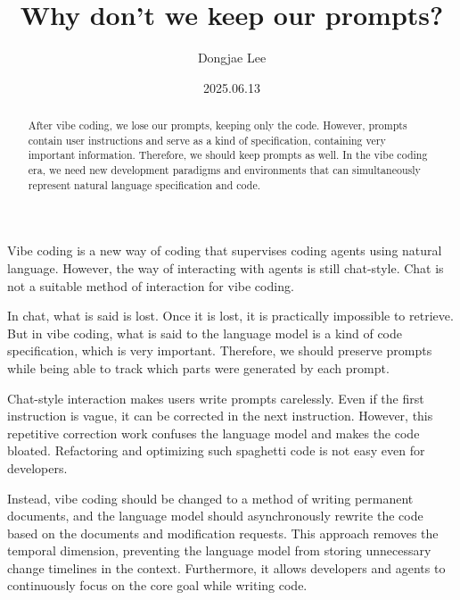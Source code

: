 \documentclass[11pt, oneside]{article}
\title{Why don't we keep our prompts?}
\author{Dongjae Lee}
\date{2025.06.13}
\begin{document}
\maketitle

\begin{abstract}
	After vibe coding, we lose our prompts, keeping only the code.
	However, prompts contain user instructions and serve as a kind of specification, containing very important information.
	Therefore, we should keep prompts as well.
	In the vibe coding era, we need new development paradigms and environments that can simultaneously represent natural language specification and code.
\end{abstract}

Vibe coding is a new way of coding that supervises coding agents using natural language.
However, the way of interacting with agents is still chat-style.
Chat is not a suitable method of interaction for vibe coding.

In chat, what is said is lost. Once it is lost, it is practically impossible to retrieve.
But in vibe coding, what is said to the language model is a kind of code specification, which is very important.
Therefore, we should preserve prompts while being able to track which parts were generated by each prompt.

Chat-style interaction makes users write prompts carelessly.
Even if the first instruction is vague, it can be corrected in the next instruction.
However, this repetitive correction work confuses the language model and makes the code bloated.
Refactoring and optimizing such spaghetti code is not easy even for developers.

Instead, vibe coding should be changed to a method of writing permanent documents,
and the language model should asynchronously rewrite the code based on the documents and modification requests.
This approach removes the temporal dimension, preventing the language model from storing unnecessary change timelines in the context.
Furthermore, it allows developers and agents to continuously focus on the core goal while writing code.
\end{document}
